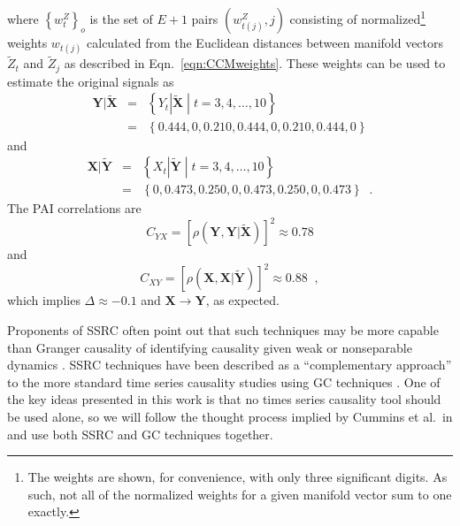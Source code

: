 \documentclass{article}[10pt]
\begin{document}
where $\left\{w_{t}^Z\right\}_o$ is the set of $E+1$ pairs $\left(w_{t(j)}^Z,j\right)$ consisting of normalized\footnote{The weights are shown, for convenience, with only three significant digits. As such, not all of the normalized weights for a given manifold vector sum to one exactly.} weights $w_{t(j)}$ calculated from the Euclidean distances between manifold vectors $\tilde{Z}_t$ and $\tilde{Z}_j$ as described in Eqn.\ \ref{eqn:CCMweights}.  These weights can be used to estimate the original signals as
\begin{eqnarray}
\mathbf{Y}|\tilde{\mathbf{X}} &=& \left\{Y_t|\tilde{\mathbf{X}}\;|\;t=3,4,\ldots,10\right\}\\ 
&=& \left\{ 0.444,0,0.210,0.444,0,0.210,0.444,0\right\} 
\end{eqnarray}
and
\begin{eqnarray}
\mathbf{X}|\tilde{\mathbf{Y}} &=& \left\{X_t|\tilde{\mathbf{Y}}\;|\;t=3,4,\ldots,10\right\}\\ 
&=& \left\{ 0,0.473,0.250,0,0.473,0.250,0,0.473\right\}\;\;. 
\end{eqnarray}
The PAI correlations are
\begin{equation}
C_{YX} = \left[\rho\left(\mathbf{Y},\mathbf{Y}|\tilde{\mathbf{X}}\right)\right]^2 \approx 0.78
\end{equation}
and
\begin{equation}
C_{XY} = \left[\rho\left(\mathbf{X},\mathbf{X}|\tilde{\mathbf{Y}}\right)\right]^2 \approx 0.88\;\;,
\end{equation}
which implies $\Delta \approx -0.1$ and $\mathbf{X}\rightarrow\mathbf{Y}$, as expected.

Proponents of SSRC often point out that such techniques may be more capable than Granger causality of identifying causality given weak or nonseparable dynamics \cite{Sugihara2012,Ma2014,Cummins2015}.  SSRC techniques have been described as a ``complementary approach'' to the more standard time series causality studies using GC techniques \cite{Cummins2015}.  One of the key ideas presented in this work is that no times series causality tool should be used alone, so we will follow the thought process implied by Cummins et al.\ in \cite{Cummins2015} and use both SSRC and GC techniques together.
\end{document}
